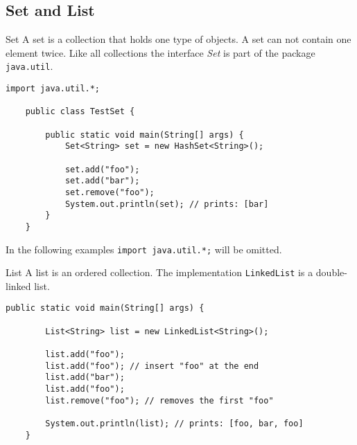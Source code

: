 \subsection{Set and List}
\begin{frame}[fragile]{Set}
	A set is a collection that holds one type of objects.
	A set can not contain one element twice.
	Like all collections the interface \emph{Set} is part of the package \texttt{java.util}.
	\begin{lstlisting}[basicstyle=\ttfamily\scriptsize]
	import java.util.*;

	public class TestSet {
	    
	    public static void main(String[] args) {
	        Set<String> set = new HashSet<String>();
	    
	        set.add("foo");
	        set.add("bar");
	        set.remove("foo");
	        System.out.println(set); // prints: [bar]
	    }
	}
	\end{lstlisting}
	In the following examples \texttt{import java.util.*;} will be omitted.
\end{frame}

\begin{frame}[fragile]{List}
	A list is an ordered collection.
	\vfill
	The implementation \texttt{LinkedList} is a double-linked list.
	\begin{lstlisting}[basicstyle=\ttfamily\scriptsize]
	public static void main(String[] args) {
	
	    List<String> list = new LinkedList<String>();
	    
	    list.add("foo"); 
	    list.add("foo"); // insert "foo" at the end
	    list.add("bar");
	    list.add("foo");
	    list.remove("foo"); // removes the first "foo"
	    
	    System.out.println(list); // prints: [foo, bar, foo]
	}
	\end{lstlisting}
\end{frame}
	
